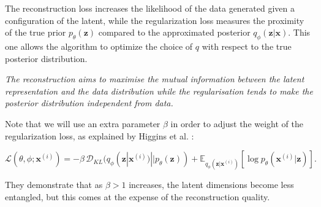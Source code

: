 \documentclass{article}
\begin{document}
The reconstruction loss increases the likelihood of the data generated given a configuration of the latent, while the regularization loss measures the proximity of the true prior $p_\theta (\textbf{z})$ compared to the approximated posterior $q_\phi(\textbf{z}|\textbf{x})$. This one allows the algorithm to optimize the choice of $q$ with respect to the true posterior distribution. 

\textit{The reconstruction aims to maximise the mutual information between the latent representation and the data distribution while the regularisation tends to make the posterior distribution independent from data.}

Note that we will use an extra parameter $\beta$ in order to adjust the weight of the regularization loss, as explained by Higgins et al. \cite{higginsVVAELEARNINGBASIC2017} :

\begin{center}
    \begin{equation}\label{eq:loss1beta}
        \mathcal{L}(\theta, \phi ; \textbf{x}^{(i)}) = - \beta \, \mathcal{D}_{KL}(q_\phi(\textbf{z} | \textbf{x}^{(i)}) || p_\theta(\textbf{z})) + \mathbb{E}_{q_\phi(\textbf{z} | \textbf{x}^{(i)})} [\log p_\theta(\textbf{x}^{(i)} | \textbf{z})].
    \end{equation}
\end{center}

They demonstrate that as $\beta > 1$ increases, the latent dimensions become less entangled, but this comes at the expense of the reconstruction quality.
\end{document}
